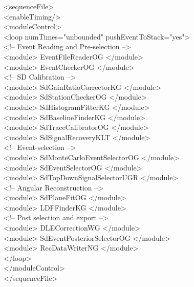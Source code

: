 \begingroup
  \selectfont <sequenceFile>\\
  \null\quad <enableTiming/>\\
  \null\quad <moduleControl>\\
  \null\qquad <loop numTimes="unbounded" pushEventToStack="yes"> \\
    \null\qquad \quad  <!-- Event Reading and Pre-selection -->\\
    \null\qquad \quad  <module> EventFileReaderOG </module>\\
    \null \qquad \quad  <module> EventCheckerOG </module>\\
    \null\qquad \quad  <!-- SD Calibration -->\\
    \null\qquad \quad   <module> SdGainRatioCorrectorKG </module>\\
    \null\qquad \quad   <module> SdStationCheckerOG </module>\\
    \null\qquad \quad   <module> SdHistogramFitterKG </module>\\
    \null\qquad \quad   <module> SdBaselineFinderKG </module>\\
    \null\qquad \quad   <module> SdTraceCalibratorOG </module>\\
    \null\qquad \quad   <module> SdSignalRecoveryKLT </module>\\
    \null\qquad \quad  <!-- Event-selection -->\\
    \null\qquad \quad   <module> SdMonteCarloEventSelectorOG </module>\\
    \null\qquad \quad   <module> SdEventSelectorOG </module>\\
    \null\qquad \quad   <module> SdTopDownSignalSelectorUGR </module>\\
    \null\qquad \quad  <!-- Angular Reconstruction -->\\
    \null\qquad \quad   <module> SdPlaneFitOG </module>\\
    \null\qquad \quad   <module> LDFFinderKG </module>\\
    \null\qquad \quad  <!-- Post selection and export -->\\
    \null\qquad \quad   <module> DLECorrectionWG </module>\\
    \null\qquad \quad   <module> SdEventPosteriorSelectorOG </module>\\
    \null\qquad \quad   <module> RecDataWriterNG </module>\\
  \null \qquad  </loop>\\
  \null \quad  </moduleControl>\\
  \null \quad  </sequenceFile>\\
\endgroup

